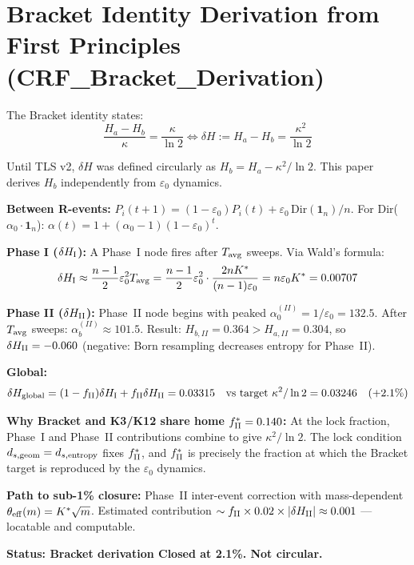 \documentclass[12pt, a4paper]{article}
\begin{document}
\section{Bracket Identity Derivation from First Principles (CRF\_Bracket\_Derivation)}

\begin{derivedbox}[title={$\delta H = \kappa^2/\ln 2$ from Born Resampling --- Closed at 2.1\% (Not Circular)}]
The Bracket identity states:
\[
  \frac{H_a - H_b}{\kappa} = \frac{\kappa}{\ln 2} \iff \delta H := H_a - H_b = \frac{\kappa^2}{\ln 2}
\]

Until TLS v2, $\delta H$ was defined circularly as $H_b = H_a - \kappa^2/\ln 2$. This paper derives $H_b$ independently from $\varepsilon_0$ dynamics.

\textbf{Between R-events:} $P_i(t+1) = (1-\varepsilon_0)P_i(t) + \varepsilon_0\,\text{Dir}(\mathbf{1}_n)/n$.
For Dir($\alpha_0\cdot\mathbf{1}_n$): $\alpha(t) = 1 + (\alpha_0-1)(1-\varepsilon_0)^t$.

\textbf{Phase I ($\delta H_{\rm I}$):} A Phase~I node fires after $T_{\rm avg}$ sweeps. Via Wald's formula:
\[
  \delta H_{\rm I} \approx \frac{n-1}{2}\varepsilon_0^2 T_{\rm avg}
  = \frac{n-1}{2}\varepsilon_0^2\cdot\frac{2nK^*}{(n-1)\varepsilon_0}
  = n\varepsilon_0 K^* = 0.00707
\]

\textbf{Phase II ($\delta H_{\rm II}$):} Phase~II node begins with peaked $\alpha_0^{(II)} = 1/\varepsilon_0 = 132.5$. After $T_{\rm avg}$ sweeps: $\alpha_b^{(II)} \approx 101.5$. Result: $H_{b,II} = 0.364 > H_{a,II} = 0.304$, so $\delta H_{\rm II} = -0.060$ (negative: Born resampling decreases entropy for Phase~II).

\textbf{Global:}
\[
  \delta H_{\rm global} = (1-f_{\rm II})\delta H_{\rm I} + f_{\rm II}\delta H_{\rm II} = 0.03315
  \quad\text{vs target }\kappa^2/\ln 2 = 0.03246\quad (+2.1\%)
\]

\textbf{Why Bracket and K3/K12 share home $f_{\rm II}^* = 0.140$:} At the lock fraction, Phase~I and Phase~II contributions combine to give $\kappa^2/\ln 2$. The lock condition $d_{s,\rm geom} = d_{s,\rm entropy}$ fixes $f_{\rm II}^*$, and $f_{\rm II}^*$ is precisely the fraction at which the Bracket target is reproduced by the $\varepsilon_0$ dynamics.

\textbf{Path to sub-1\% closure:} Phase~II inter-event correction with mass-dependent $\theta_{\rm eff}(m) = K^*\sqrt{m}$. Estimated contribution $\sim f_{\rm II}\times 0.02\times|\delta H_{\rm II}| \approx 0.001$ --- locatable and computable.

\textbf{Status: Bracket derivation Closed at 2.1\%. Not circular.}
\end{derivedbox}
\end{document}

